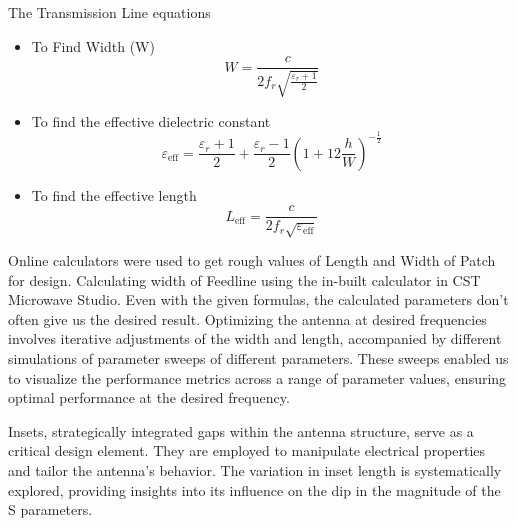 \documentclass[a4paper,12pt]{report}
\begin{document}
The Transmission Line equations
\begin{itemize}
    \setlength\itemsep{0em} %
    \item To Find Width (W)
    \begin{equation}
    	W = \frac{c}{2f_r \sqrt{\frac{\varepsilon_r + 1}{2}}}
    \end{equation}

    \item To find the effective dielectric constant
    \begin{equation}
        \varepsilon_{\text{eff}} = \frac{\varepsilon_r + 1}{2} + \frac{\varepsilon_r - 1}{2}\left(1 + 12 \frac{h}{W}\right)^{-\frac{1}{2}}
    \end{equation}

    \item To find the effective length
    \begin{equation}
        L_{\text{eff}} = \frac{c}{2f_r \sqrt{\varepsilon_{\text{eff}}}}
    \end{equation}
\end{itemize}




Online calculators were used to get rough values of Length and Width of Patch for design. Calculating width of Feedline using the in-built calculator in CST Microwave Studio. Even with the given formulas, the calculated parameters don’t often give us the desired result. Optimizing the antenna at desired frequencies involves iterative adjustments of the width and length, accompanied by different simulations of parameter sweeps of different parameters. These sweeps enabled us to visualize the performance metrics across a range of parameter values, ensuring optimal performance at the desired frequency.

Insets, strategically integrated gaps within the antenna structure, serve as a critical design element. They are employed to manipulate electrical properties and tailor the antenna's behavior. The variation in inset length is systematically explored, providing insights into its influence on the dip in the magnitude of the S parameters.
\end{document}
